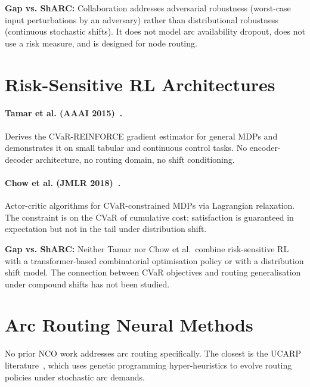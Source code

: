 \documentclass[11pt]{article}
\begin{document}
\textbf{Gap vs. ShARC:} Collaboration addresses adversarial robustness
(worst-case input perturbations by an adversary) rather than distributional
robustness (continuous stochastic shifts).  It does not model arc
availability dropout, does not use a risk measure, and is designed for
node routing.

\section{Risk-Sensitive RL Architectures}

\paragraph{Tamar et al. (AAAI 2015)~\cite{tamar2015optimizing}.}
Derives the CVaR-REINFORCE gradient estimator for general MDPs and
demonstrates it on small tabular and continuous control tasks.  No
encoder-decoder architecture, no routing domain, no shift conditioning.

\paragraph{Chow et al. (JMLR 2018)~\cite{chow2018risk}.}
Actor-critic algorithms for CVaR-constrained MDPs via Lagrangian relaxation.
The constraint is on the CVaR of cumulative cost; satisfaction is guaranteed
in expectation but not in the tail under distribution shift.

\textbf{Gap vs. ShARC:} Neither Tamar nor Chow et al.\ combine risk-sensitive
RL with a transformer-based combinatorial optimisation policy or with a
distribution shift model.  The connection between CVaR objectives and routing
generalisation under compound shifts has not been studied.

\section{Arc Routing Neural Methods}

No prior NCO work addresses arc routing specifically.  The closest is the
UCARP literature~\cite{mei2010carp}, which uses genetic programming
hyper-heuristics to evolve routing policies under stochastic arc demands.
\end{document}
